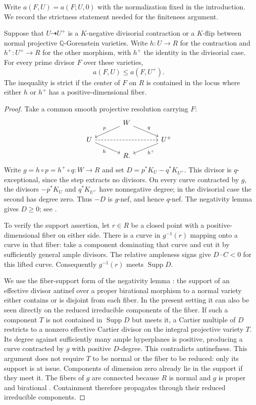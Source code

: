 Write $a(F,U)=a(F;U,0)$ with the normalization fixed in the
introduction.  We record the strictness statement needed for the
finiteness argument.

\begin{lemma}\label{mmp:strict}
Suppose that $U\dashrightarrow U^+$ is a $K$-negative divisorial
contraction or a $K$-flip between normal projective
$\mathbb Q$-Gorenstein varieties.  Write $h:U\to R$ for the
contraction and $h^+:U^+\to R$ for the other morphism, with $h^+$
the identity in the divisorial case.  For every prime divisor $F$
over these varieties,
\[
 a(F,U)\leq a(F,U^+).
\]
The inequality is strict if the center of $F$ on $R$ is contained
in the locus where either $h$ or $h^+$ has a positive-dimensional
fiber.
\end{lemma}

\begin{proof}
Take a common smooth projective resolution carrying $F$:
\[
\begin{tikzcd}[column sep=large,row sep=small]
 & W \arrow[dl,"p"'] \arrow[dr,"q"] & \\
 U \arrow[dr,"h"'] \arrow[rr,dashed] & & U^+ \arrow[dl,"h^+"] \\
 & R. &
\end{tikzcd}
\]
Write $g=h\circ p=h^+\circ q:W\to R$ and set
$D=p^*K_U-q^*K_{U^+}$.  This divisor is $q$-exceptional,
since the step extracts no divisors.  On every curve contracted by
$g$, the divisors $-p^*K_U$ and $q^*K_{U^+}$ have nonnegative
degree; in the divisorial case the second has degree zero.
Thus $-D$ is $g$-nef, and hence $q$-nef.  The negativity lemma
gives $D\geq 0$; see \cite[Lemmas~3.38--3.39]{KM98}.

To verify the support assertion, let $r\in R$ be
a closed point with a positive-dimensional fiber on either side.
There is a curve in $g^{-1}(r)$ mapping onto a curve in that fiber:
take a component dominating that curve and cut it by sufficiently
general ample divisors.  The relative ampleness signs give $D\cdot C<0$
for this lifted curve.  Consequently $g^{-1}(r)$ meets
$\operatorname{Supp}D$.

We use the fiber-support form of the negativity lemma
\cite[Lemma~3.39]{KM98}: the support of an effective divisor
antinef over a proper birational morphism to a normal variety either
contains or is disjoint from each fiber. In the present setting it can
also be seen directly on the reduced irreducible components of the
fiber. If such a component $T$ is not contained in $\operatorname{Supp}D$
but meets it, a Cartier multiple of $D$ restricts to a nonzero effective
Cartier divisor on the integral projective variety $T$. Its degree against
sufficiently many ample hyperplanes is positive, producing a curve
contracted by $g$ with positive $D$-degree. This contradicts antinefness.
This argument does not require $T$ to be normal or the fiber to be reduced:
only its support is at issue. Components of dimension zero already lie
in the support if they meet it. The fibers of $g$ are connected because
$R$ is normal and $g$ is proper and birational
\cite[Corollary~III.11.4]{Hartshorne77}. Containment therefore propagates
through their reduced irreducible components.


\end{proof}
